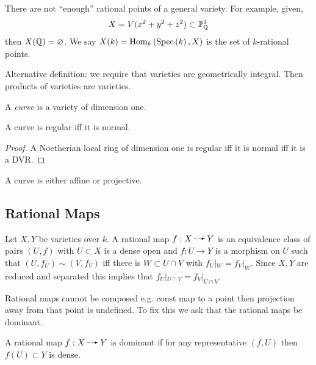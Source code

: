 \documentclass[12pt]{article}
\begin{document}
\begin{rmk}
There are not ``enough'' rational points of a general variety. For example, given,
\[ X = V(x^2 + y^2 + z^2) \subset \mathbb{P}^3_{\mathbb{Q}} \]
then $X(\mathbb{Q}) = \varnothing$. We say $X(k) = \mathrm{Hom}_{k} \left( \mathrm{Spec}\left( k \right), X \right)$ is the set of $k$-rational points.
\end{rmk}

\begin{rmk}
Alternative definition: we require that varieties are geometrically integral. Then products of varieties are varieties. 
\end{rmk}

\begin{defn}
A \textit{curve} is a variety of dimension one.
\end{defn}

\begin{lemma}
A curve is regular iff it is normal.
\end{lemma}

\begin{proof}
A Noetherian local ring of dimension one is regular iff it is normal iff it is a DVR.
\end{proof}

\begin{lemma}
A curve is either affine or projective. 
\end{lemma}

\subsection{Rational Maps}

\begin{defn}
Let $X, Y$ be varieties over $k$. A rational map $f : X \rat Y$ is an equivalence class of pairs $(U, f)$ with $U \subset X$ is a dense open and $f : U \to Y$ is a morphism on $U$ such that $(U, f_U) \sim (V, f_V)$ iff there is $W \subset U \cap V$ with $f_U |_W = f_V |_W$. Since $X, Y$ are reduced and separated this implies that $f_U |_{U \cap V} = f_V |_{U \cap V}$.
\end{defn}

\begin{rmk}
Rational maps cannot be composed e.g. const map to a point then projection away from that point is undefined. To fix this we ask that the rational maps be dominant.
\end{rmk}

\begin{defn}
A rational map $f : X \rat Y$ is dominant if for any representative $(f, U)$ then $f(U) \subset Y$ is dense.
\end{defn}
\end{document}

